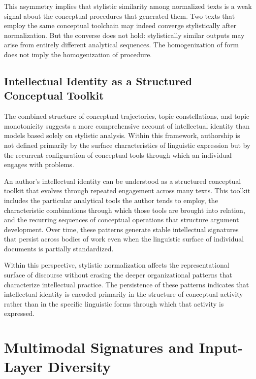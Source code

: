 \documentclass[12pt,a4paper]{article}
\theoremstyle{definition}
\theoremstyle{plain}
\theoremstyle{remark}
\begin{document}
This asymmetry implies that stylistic similarity among normalized texts is a weak signal
about the conceptual procedures that generated them. Two texts that employ the same
conceptual toolchain may indeed converge stylistically after normalization. But the converse
does not hold: stylistically similar outputs may arise from entirely different analytical
sequences. The homogenization of form does not imply the homogenization of procedure.

\subsection{Intellectual Identity as a Structured Conceptual Toolkit}

The combined structure of conceptual trajectories, topic constellations, and topic
monotonicity suggests a more comprehensive account of intellectual identity than models based
solely on stylistic analysis. Within this framework, authorship is not defined primarily by
the surface characteristics of linguistic expression but by the recurrent configuration of
conceptual tools through which an individual engages with problems.

An author's intellectual identity can be understood as a structured conceptual toolkit that
evolves through repeated engagement across many texts. This toolkit includes the particular
analytical tools the author tends to employ, the characteristic combinations through which
those tools are brought into relation, and the recurring sequences of conceptual operations
that structure argument development. Over time, these patterns generate stable intellectual
signatures that persist across bodies of work even when the linguistic surface of individual
documents is partially standardized.

Within this perspective, stylistic normalization affects the representational surface of
discourse without erasing the deeper organizational patterns that characterize intellectual
practice. The persistence of these patterns indicates that intellectual identity is encoded
primarily in the structure of conceptual activity rather than in the specific linguistic
forms through which that activity is expressed.

\section{Multimodal Signatures and Input-Layer Diversity}
\label{sec:multimodal}
\end{document}
